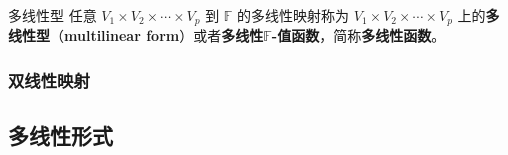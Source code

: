 \begin{definition}{多线性型}\label{def_MulMap_2}
任意 $V_1\times V_2\times\cdots\times V_p$ 到 $\mathbb{F}$ 的多线性映射称为 $V_1\times V_2\times\cdots\times V_p$ 上的\textbf{多线性型}（\textbf{multilinear form}）或者\textbf{多线性$\mathbb{F}$-值函数}，简称\textbf{多线性函数}。
\end{definition}


% 

\subsubsection{双线性映射}


\subsection{多线性形式}